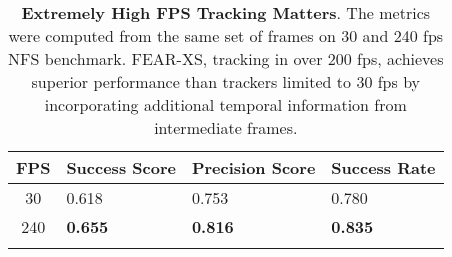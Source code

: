 \documentclass[runningheads]{llncs}
\begin{document}
\begin{table}[tb]
\small
\renewcommand{\arraystretch}{0.95}
\centering
\begin{tabular}{c|l|l|l}
\noalign{\smallskip}
\quad FPS \quad \quad & Success Score & Precision Score & Success Rate\\
\hline
30 & 0.618 & 0.753 & 0.780\\
240 & \textbf{0.655} & \textbf{0.816} & \textbf{0.835}\\
\noalign{\smallskip}
\end{tabular}
\caption{ \textbf{Extremely High FPS Tracking Matters}. The metrics were computed from the same set of frames on 30 and 240 fps NFS benchmark\cite{nfs}. FEAR-XS, tracking in over 200 fps, achieves superior performance than trackers limited to 30 fps by incorporating additional temporal information from intermediate frames.
}
\label{t:fps}
\end{table} 
\end{document}
